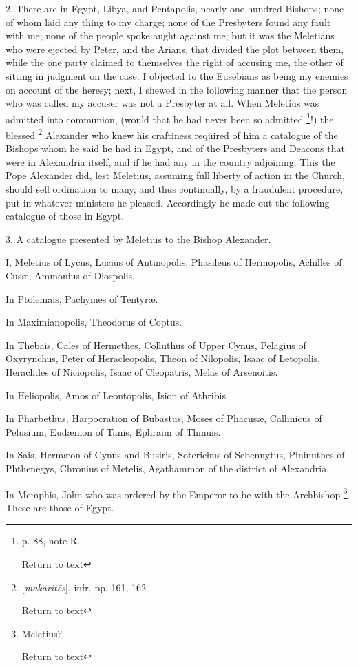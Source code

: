 2. There are in Egypt, Libya, and Pentapolis,
nearly one hundred Bishops; none of whom laid any thing to my charge;
none of the Presbyters found any fault with me; none of the people
spoke aught against me; but it was the Meletians who were ejected by
Peter, and the Arians, that divided the plot between them, while the
one party claimed to themselves the right of accusing me, the other of
sitting in judgment on the case. I objected to the Eusebians as being
my enemies on account of the heresy; next, I shewed in the following
manner that the person who was called my accuser was not a Presbyter
at all. When Meletius was admitted into communion, (would that he had
never been so admitted \footnote{p. 88, note R.

Return to text}!)
the blessed \footnote{[\emph{makarit\={e}s}], infr. pp. 161, 162.

Return to text} Alexander
who knew his craftiness required of him a catalogue of the Bishops
whom he said he had in Egypt, and of the Presbyters and Deacons
that were in Alexandria itself, and if he had any in the country
adjoining. This the Pope Alexander did, lest Meletius, assuming full
liberty of action in the Church, should sell ordination to many, and
thus continually, by a fraudulent procedure, put in whatever ministers
he pleased. Accordingly he made out the following catalogue of those
in Egypt.

3. A catalogue presented by Meletius to the
Bishop Alexander.

I, Meletius of Lycus, Lucius of Antinopolis,
Phasileus of Hermopolis, Achilles of Cusæ, Ammonius of Diospolis.

In Ptolemais, Pachymes of Tentyræ.

In Maximianopolis, Theodorus of Coptus.

In Thebais, Cales of Hermethes, Colluthus of
Upper Cynus, Pelagius of Oxyrynchus, Peter of Heracleopolis, Theon of
Nilopolis, Isaac of Letopolis, Heraclides of Niciopolis, Isaac of
Cleopatris, Melas of Arsenoitis.

In Heliopolis, Amos of Leontopolis, Ision of
Athribis.

In Pharbethus, Harpocration of Bubastus, Moses of
Phacusæ, Callinicus of Pelusium, Eudæmon of Tanis, Ephraim of Thmuis.

In Sais, Hermæon of Cynus and Busiris,
Soterichus of Sebennytus, Pininuthes of Phthenegys, Chronius of
Metelis, Agathammon of the district of Alexandria.

In Memphis, John who was ordered by the Emperor
to be with the Archbishop \footnote{Meletius?

Return to text}.
These are those of Egypt.

